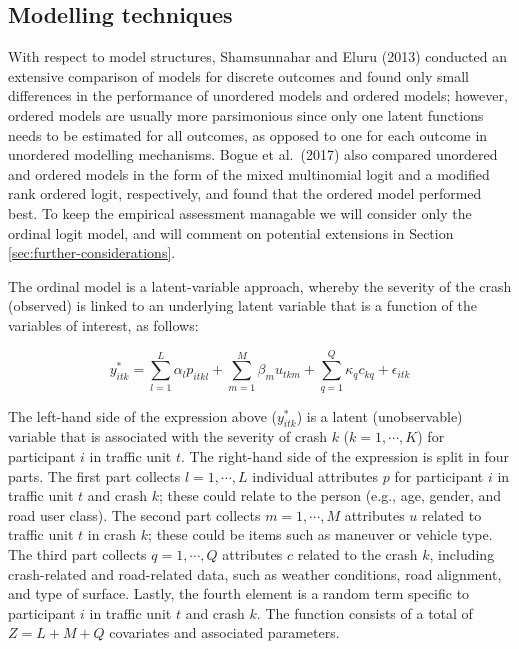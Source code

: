 \documentclass[]{elsarticle} %
\begin{document}
\hypertarget{sec:techniques}{%
\subsection{Modelling techniques}\label{sec:techniques}}

With respect to model structures, Shamsunnahar and Eluru (2013)
conducted an extensive comparison of models for discrete outcomes and
found only small differences in the performance of unordered models and
ordered models; however, ordered models are usually more parsimonious
since only one latent functions needs to be estimated for all outcomes,
as opposed to one for each outcome in unordered modelling mechanisms.
Bogue et al.~(2017) also compared unordered and ordered models in the
form of the mixed multinomial logit and a modified rank ordered logit,
respectively, and found that the ordered model performed best. To keep
the empirical assessment managable we will consider only the ordinal
logit model, and will comment on potential extensions in Section
\ref{sec:further-considerations}.

The ordinal model is a latent-variable approach, whereby the severity of
the crash (observed) is linked to an underlying latent variable that is
a function of the variables of interest, as follows:

\begin{equation}
\label{eq:latent-function}
y_{itk}^*=\sum_{l=1}^L\alpha_lp_{itkl} + \sum_{m=1}^M\beta_mu_{tkm} + \sum_{q=1}^Q\kappa_qc_{kq} + \epsilon_{itk}
\end{equation}

The left-hand side of the expression above (\(y_{itk}^*\)) is a latent
(unobservable) variable that is associated with the severity of crash
\(k\) (\(k=1,\cdots,K\)) for participant \(i\) in traffic unit \(t\).
The right-hand side of the expression is split in four parts. The first
part collects \(l=1,\cdots,L\) individual attributes \(p\) for
participant \(i\) in traffic unit \(t\) and crash \(k\); these could
relate to the person (e.g., age, gender, and road user class). The
second part collects \(m=1,\cdots,M\) attributes \(u\) related to
traffic unit \(t\) in crash \(k\); these could be items such as maneuver
or vehicle type. The third part collects \(q=1,\cdots,Q\) attributes
\(c\) related to the crash \(k\), including crash-related and
road-related data, such as weather conditions, road alignment, and type
of surface. Lastly, the fourth element is a random term specific to
participant \(i\) in traffic unit \(t\) and crash \(k\). The function
consists of a total of \(Z=L+M+Q\) covariates and associated parameters.
\end{document}
